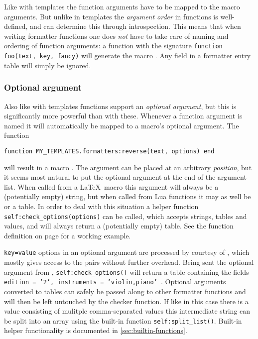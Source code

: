 \documentclass{scrartcl}
\begin{document}
Like with templates the function arguments have to be mapped to the macro
arguments.  But unlike in templates the \emph{argument order} in functions is well-defined, and  can determine this through
introspection.  This means that when writing formatter functions one does
\emph{not} have to take care of naming and ordering of function arguments: a
function with the signature \texttt{function foo(text, key, fancy)}
will generate the macro \texttt{}.  Any
 field in a formatter entry table will simply be ignored.


\subsubsection{Optional argument}
\label{sec:functions-optional-argument}

Also like with templates functions support an \emph{optional argument}, but this
is significantly more powerful than with these.  Whenever a function argument is
named  it will automatically be mapped to a macro's optional
argument.  The function

\begin{verbatim}
function MY_TEMPLATES.formatters:reverse(text, options) end
\end{verbatim}

\noindent will result in a macro \texttt{}. The
 argument can be placed at an arbitrary \emph{position}, but it
seems most natural to put the optional argument at the end of the argument list.
When called from a \LaTeX\ macro this argument will always be a (potentially
empty) string, but when called from Lua functions it may as well be 
or a table.  In order to deal with this situation a helper function
\texttt{self:check_options(options)} can be called, which accepts
strings, tables and  values, and will always return a (potentially
empty) table.  See the function definition on page \pageref{code:function} for a
working example.

\texttt{key=value} options in an optional argument are processed by courtesy of
, which mostly gives access to the pairs without further
overhead.   Being sent the optional argument from
\texttt{\foo[edition=2,instruments={violin,piano}]},
\texttt{self:check_options()} will return a table containing the fields
\texttt{{ edition = '2', instruments = 'violin,piano' }}. Optional arguments converted to tables can safely be passed along to other
formatter functions and will then be left untouched by the checker function.  If
like in this case there is a value consisting of mulitple comma-separated values
this intermediate string can be split into an array using the built-in function
\texttt{self:split_list()}.  Built-in helper functionality is documented in \vref{sec:builtin-functions}.
\end{document}
